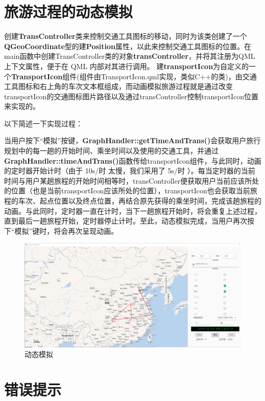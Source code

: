 \documentclass[lang=cn,blue,14pt]{elegantbook}
\begin{document}
\section{旅游过程的动态模拟}

创建\textbf{TransController}类来控制交通工具图标的移动，同时为该类创建了一个\textbf{QGeoCoordinate}型的建\textbf{Position}属性，以此来控制交通工具图标的位置。在main函数中创建TransController类的对象\textbf{transController}，并将其注册为QML上下文属性，便于在 QML 内部对其进行调用。
建\textbf{transportIcon}为自定义的一个\textbf{TransportIcon}组件(组件由TransportIcon.qml实现，类似C++的类)，由交通工具图标和右上角的车次文本框组成，而动画模拟旅游过程就是通过改变transportIcon的交通图标图片路径以及通过transController控制transportIcon位置来实现的。

以下简述一下实现过程：

当用户按下“模拟”按键，\textbf{GraphHandler::getTimeAndTrans()}会获取用户旅行规划中的每一趟的开始时间、乘坐时间以及使用的交通工具，并通过\textbf{GraphHandler::timeAndTrans()}函数传给transportIcon组件，与此同时，动画的定时器开始计时（由于 10s/时 太慢，我们采用了 5s/时 ）。每当定时器的当前时间与用户某趟旅程的开始时间相等时，transController便获取用户当前应该所处的位置（也是当前transportIcon应该所处的位置），transportIcon也会获取当前旅程的车次、起点位置以及终点位置，再结合原先获得的乘坐时间，完成该趟旅程的动画。与此同时，定时器一直在计时，当下一趟旅程开始时，将会重复上述过程，直到最后一趟旅程开始，定时器停止计时。至此，动态模拟完成，当用户再次按下“模拟”键时，将会再次呈现动画。

\begin{figure}[!htbp]
	\centering
	\includegraphics[width=.9\textwidth]{sim.png}
	\caption{动态模拟}
	\label{sim}
\end{figure}

\section{错误提示}
\end{document}
